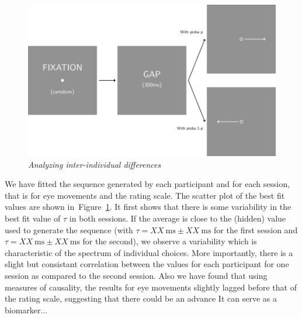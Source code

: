 \documentclass[profile,final,english,draft]{article}%
\newcommand{\ms}{\si{\milli\second}}%
\newcommand{\seeFig}[1]{Figure~\ref{fig:#1}}
\begin{document}
\begin{figure}%
\begin{center}
    \includegraphics[width=1\linewidth]{figure5}
\end{center}
\caption{\emph{Analyzing inter-individual differences}
}
\label{fig:results_inter}
\end{figure}
We have fitted the sequence generated by each participant and
for each session, that is for eye movements and the rating scale.
The scatter plot of the best fit values are shown in~\seeFig{results_inter}.
It first shows that there is some variability in the best fit value of $\tau$
in both sessions.
If the average is close to the (hidden) value used to generate the sequence
(with $\tau = XX~\ms \pm XX~\ms$ for the first session and
 $\tau = XX~\ms \pm XX~\ms$ for the second),
 we observe a variability which is characteristic of the spectrum of individual choices.
More importantly, there is a slight but consistant
correlation between the values for each participant for one session
as compared to the second session.
Also we have found that using measures of causality,
the results for eye movements slightly lagged before
that of the rating scale,
suggesting that there could be an advance
It can serve as a biomarker...
\end{document}
